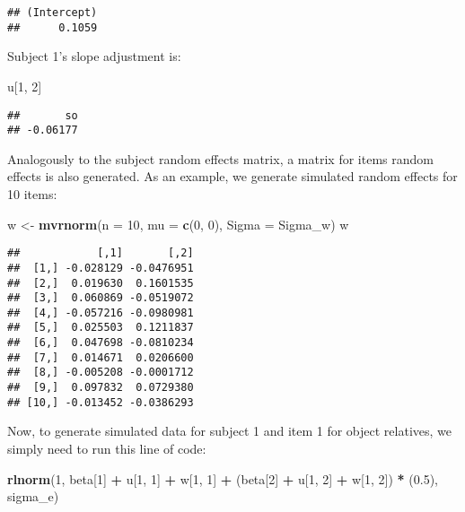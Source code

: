 \documentclass[12pt,]{krantz}
\newenvironment{Shaded}{\begin{snugshade}}{\end{snugshade}}
\newcommand{\DataTypeTok}[1]{\textcolor[rgb]{0.13,0.29,0.53}{#1}}
\newcommand{\DecValTok}[1]{\textcolor[rgb]{0.00,0.00,0.81}{#1}}
\newcommand{\FloatTok}[1]{\textcolor[rgb]{0.00,0.00,0.81}{#1}}
\newcommand{\KeywordTok}[1]{\textcolor[rgb]{0.13,0.29,0.53}{\textbf{#1}}}
\newcommand{\NormalTok}[1]{#1}
\newcommand{\OperatorTok}[1]{\textcolor[rgb]{0.81,0.36,0.00}{\textbf{#1}}}
\newcommand{\StringTok}[1]{\textcolor[rgb]{0.31,0.60,0.02}{#1}}
\begin{document}
\begin{verbatim}
## (Intercept) 
##      0.1059
\end{verbatim}

Subject 1's slope adjustment is:

\begin{Shaded}
\begin{Highlighting}[]
\NormalTok{u[}\DecValTok{1}\NormalTok{, }\DecValTok{2}\NormalTok{]}
\end{Highlighting}
\end{Shaded}

\begin{verbatim}
##       so 
## -0.06177
\end{verbatim}

Analogously to the subject random effects matrix, a matrix for items random effects is also generated. As an example, we generate simulated random effects for 10 items:

\begin{Shaded}
\begin{Highlighting}[]
\NormalTok{w <-}\StringTok{ }\KeywordTok{mvrnorm}\NormalTok{(}\DataTypeTok{n =} \DecValTok{10}\NormalTok{, }\DataTypeTok{mu =} \KeywordTok{c}\NormalTok{(}\DecValTok{0}\NormalTok{, }\DecValTok{0}\NormalTok{), }\DataTypeTok{Sigma =}\NormalTok{ Sigma_w)}
\NormalTok{w}
\end{Highlighting}
\end{Shaded}

\begin{verbatim}
##            [,1]       [,2]
##  [1,] -0.028129 -0.0476951
##  [2,]  0.019630  0.1601535
##  [3,]  0.060869 -0.0519072
##  [4,] -0.057216 -0.0980981
##  [5,]  0.025503  0.1211837
##  [6,]  0.047698 -0.0810234
##  [7,]  0.014671  0.0206600
##  [8,] -0.005208 -0.0001712
##  [9,]  0.097832  0.0729380
## [10,] -0.013452 -0.0386293
\end{verbatim}

Now, to generate simulated data for subject 1 and item 1 for object relatives, we simply need to run this line of code:

\begin{Shaded}
\begin{Highlighting}[]
\KeywordTok{rlnorm}\NormalTok{(}\DecValTok{1}\NormalTok{, beta[}\DecValTok{1}\NormalTok{] }\OperatorTok{+}\StringTok{ }\NormalTok{u[}\DecValTok{1}\NormalTok{, }\DecValTok{1}\NormalTok{] }\OperatorTok{+}\StringTok{ }\NormalTok{w[}\DecValTok{1}\NormalTok{, }\DecValTok{1}\NormalTok{] }\OperatorTok{+}\StringTok{ }\NormalTok{(beta[}\DecValTok{2}\NormalTok{] }\OperatorTok{+}\StringTok{ }
\StringTok{  }\NormalTok{u[}\DecValTok{1}\NormalTok{, }\DecValTok{2}\NormalTok{] }\OperatorTok{+}\StringTok{ }\NormalTok{w[}\DecValTok{1}\NormalTok{, }\DecValTok{2}\NormalTok{]) }\OperatorTok{*}\StringTok{ }\NormalTok{(}\FloatTok{0.5}\NormalTok{), sigma_e)}
\end{Highlighting}
\end{Shaded}
\end{document}
